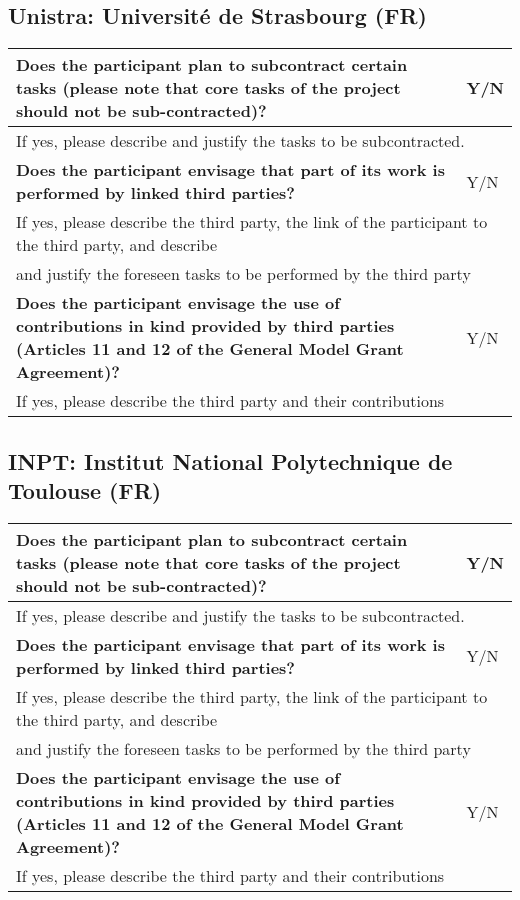 \subsection{Unistra: Université de Strasbourg (FR)}

\begin{longtable}{|p{}|p{}|}
\hline
{\bf Does the participant plan to subcontract certain tasks (please
  note that core tasks of the project should not be sub-contracted)?}
&
Y/N
\\
\hline
\multicolumn{2}{|l|}{
If yes, please describe and justify the tasks to be subcontracted.}
\\
\hline
{\bf Does the participant envisage that  part of its work is performed
  by linked third parties?}
&
Y/N
\\
\hline
\multicolumn{2}{|l|}{If yes, please describe the third party, the link of the
  participant to the third party, and describe}\\
\multicolumn{2}{|l|}{and justify the foreseen
tasks to be performed by the third party}
\\
\hline
{\bf Does the participant envisage the use of contributions in kind
provided by third parties (Articles 11 and 12 of the General Model
Grant Agreement)?}
&
Y/N
\\
\hline
\multicolumn{2}{|l|}{If yes, please describe the third party and their contributions}
\\
\hline
\end{longtable}


\subsection{INPT: Institut National Polytechnique de Toulouse (FR)}

\begin{longtable}{|p{}|p{}|}
\hline
{\bf Does the participant plan to subcontract certain tasks (please
  note that core tasks of the project should not be sub-contracted)?}
&
Y/N
\\
\hline
\multicolumn{2}{|l|}{
If yes, please describe and justify the tasks to be subcontracted.}
\\
\hline
{\bf Does the participant envisage that  part of its work is performed
  by linked third parties?}
&
Y/N
\\
\hline
\multicolumn{2}{|l|}{If yes, please describe the third party, the link of the
  participant to the third party, and describe}\\
\multicolumn{2}{|l|}{and justify the foreseen
tasks to be performed by the third party}
\\
\hline
{\bf Does the participant envisage the use of contributions in kind
provided by third parties (Articles 11 and 12 of the General Model
Grant Agreement)?}
&
Y/N
\\
\hline
\multicolumn{2}{|l|}{If yes, please describe the third party and their contributions}
\\
\hline
\end{longtable}

